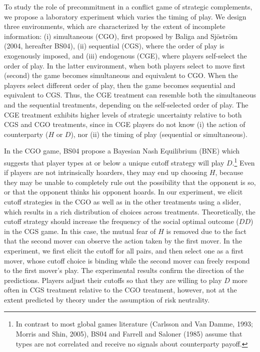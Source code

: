\documentclass[12pt,english]{article}
\begin{document}
To study the role of precommitment in a conflict game of strategic complements, we propose a laboratory experiment which varies the timing of play.  We design three environments, which are characterized by the extent of incomplete information: (i) simultaneous (CGO), first proposed by Baliga and Sj\"ostr\"om (2004, hereafter BS04), (ii) sequential (CGS), where the order of play is exogenously imposed, and (iii) endogenous (CGE), where players self-select the order of play. In the latter environment, when both players select to move first (second) the game becomes simultaneous and equivalent to CGO. When the players select different order of play, then the game becomes sequential and equivalent to CGS. Thus, the CGE treatment can resemble both the simultaneous and the sequential treatments, depending on the self-selected order of play. The CGE treatment exhibits higher levels of strategic uncertainty relative to both CGS and CGO treatments, since in CGE players do not know (i) the action of counterparty ($H$ or $D$), nor (ii) the timing of play (sequential or simultaneous). 

In the CGO game, BS04 propose a Bayesian Nash Equilibrium (BNE) which suggests that player types at or below a unique cutoff strategy will play $D$.\footnote{In contrast to most global games literature (Carlsson and Van Damme, 1993; Morris and Shin, 2005), BS04 and Farrell and Saloner (1985) assume that types are not correlated and receive no signals about counterparty payoff. } Even if players are not intrinsically hoarders, they may end up choosing $H$, because they may be unable to completely rule out the possibility that the opponent is so, or that the opponent thinks his opponent hoards. In our experiment, we elicit cutoff strategies in the CGO as well as in the other treatments using a slider, which results in a rich distribution of choices across treatments. Theoretically, the cutoff strategy should increase the frequency of the social optimal outcome ($DD$) in the CGS game. In this case, the mutual fear of $H$ is removed due to the fact that the second mover can observe the action taken by the first mover. In the experiment, we first elicit the cutoff for all pairs, and then select one as a first mover, whose cutoff choice is binding while the second mover can freely respond to the first mover's play. The experimental results confirm the direction of the predictions. Players adjust their cutoffs so that they are willing to play $D$ more often in CGS treatment relative to the CGO treatment, however, not at the extent predicted by theory under the assumption of risk neutrality.
\end{document}
